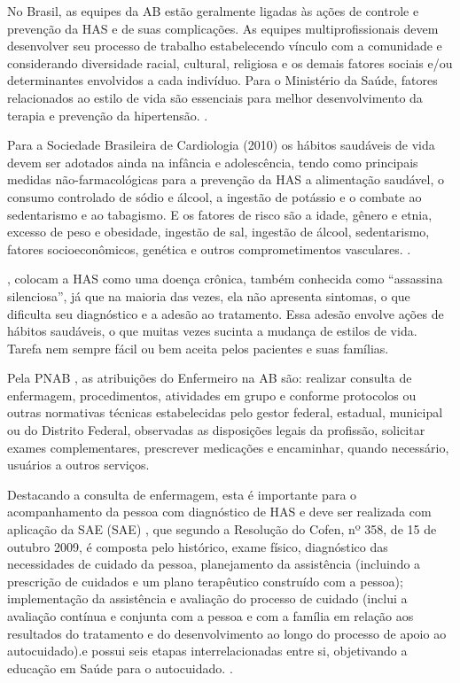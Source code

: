 No Brasil, as equipes da AB estão geralmente ligadas às ações de controle e prevenção da HAS e de suas complicações. As equipes multiprofissionais devem desenvolver seu processo de trabalho estabelecendo vínculo com a comunidade e considerando diversidade racial, cultural, religiosa e os demais fatores sociais e/ou determinantes envolvidos a cada indivíduo. Para o Ministério da Saúde, fatores relacionados ao estilo de vida são essenciais para melhor desenvolvimento da terapia e prevenção da hipertensão. \cite{atencaobasica37}.

Para a Sociedade Brasileira de Cardiologia (2010) os hábitos saudáveis de vida devem ser adotados ainda na infância e adolescência, tendo como principais medidas não-farmacológicas para a prevenção da HAS a alimentação saudável, o consumo controlado de sódio e álcool, a ingestão de potássio e o combate ao sedentarismo e ao tabagismo. E os fatores de risco são a idade, gênero e etnia, excesso de peso e obesidade, ingestão de sal, ingestão de álcool, sedentarismo, fatores socioeconômicos, genética e outros comprometimentos vasculares. \cite{hipertenso}.

\cite{da2012associaccao}, colocam a HAS como uma doença crônica, também conhecida como ``assassina silenciosa'', já que na maioria das vezes, ela não apresenta sintomas, o que dificulta seu diagnóstico e a adesão ao tratamento. Essa adesão envolve ações de hábitos saudáveis, o que muitas vezes sucinta a mudança de estilos de vida. Tarefa nem sempre fácil ou bem aceita pelos pacientes e suas famílias. 

Pela PNAB \cite{ministerio2012politica}, as atribuições do Enfermeiro na AB são: realizar consulta de enfermagem, procedimentos, atividades em grupo e conforme protocolos ou outras normativas técnicas estabelecidas pelo gestor federal, estadual, municipal ou do Distrito Federal, observadas as disposições legais da profissão, solicitar exames complementares, prescrever medicações e encaminhar, quando necessário, usuários a outros serviços. 

Destacando a consulta de enfermagem, esta é importante para o acompanhamento da pessoa com diagnóstico de HAS e deve ser realizada com aplicação da \acrlong{SAE} (\acrshort{SAE}) \cite{atencaobasica37}, que segundo a Resolução do Cofen, nº 358, de 15 de outubro 2009, é composta pelo histórico, exame físico, diagnóstico das necessidades de cuidado da pessoa, planejamento da assistência (incluindo a prescrição de cuidados e um plano terapêutico construído com a pessoa); implementação da assistência e avaliação do processo de cuidado (inclui a avaliação contínua e conjunta com a pessoa e com a família em relação aos resultados do tratamento e do desenvolvimento ao longo do processo de apoio ao autocuidado).e possui seis etapas interrelacionadas entre si, objetivando a educação em Saúde para o autocuidado. \cite{de2009resoluccao}.

